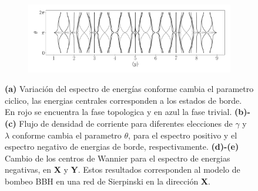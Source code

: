 \begin{figure}[h!]
     \begin{minipage}[h!]{1\textwidth}
        \begin{subfigure}[b!]{1.0 \textwidth}
            \caption{}
            \includegraphics[width=\textwidth]{Imagenes/Resultados_pump_Fractal/x/wannier_centery.pdf}
        \end{subfigure}\hspace*{-0.5em}
    \end{minipage}\vspace*{-0.5em}
     
    \caption{\textbf{(a)} Variación del espectro de energías conforme cambia el parametro ciclico, las energias centrales corresponden a los estados de borde. En rojo se encuentra la fase topologica y en azul la fase trivial. \textbf{(b)-(c)} Flujo de densidad de corriente para diferentes elecciones de $\gamma$ y $\lambda$ conforme cambia el parametro $\theta$, para el espectro positivo y el espectro negativo de energias de borde, respectivamente. \textbf{(d)-(e)} Cambio de los centros de Wannier para el espectro de energias negativas, en \textbf{X} y \textbf{Y}. Estos resultados corresponden al modelo de bombeo BBH en una red de Sierpinski en la dirección \textbf{X}.}
    \label{fig:Pump_fractal_x}
\end{figure}